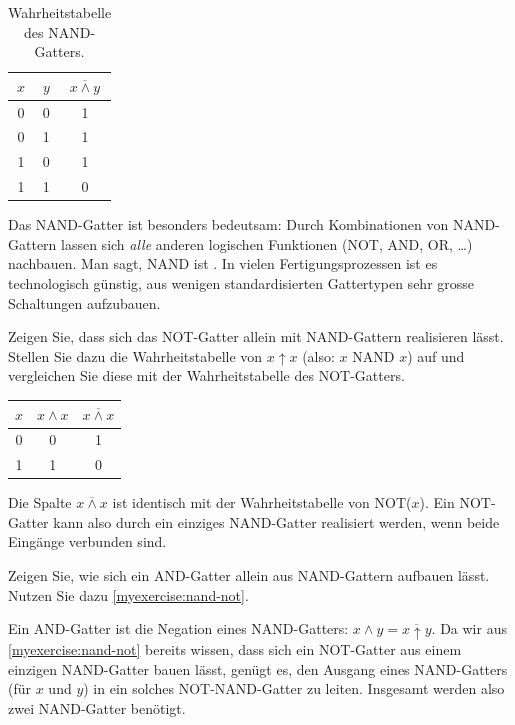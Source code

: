 \begin{table}[H]
    \centering
    \begin{tabular}{c|c||c}
        $x$ & $y$ & $\overline{x \wedge y}$ \\\midrule\midrule
        0 & 0 & 1 \\\midrule
        0 & 1 & 1 \\\midrule
        1 & 0 & 1 \\\midrule
        1 & 1 & 0 \\
    \end{tabular}
    \caption{Wahrheitstabelle des NAND-Gatters.}
    \label{tab:nand}
\end{table}

Das NAND-Gatter ist besonders bedeutsam: Durch Kombinationen von NAND-Gattern lassen sich \emph{alle} anderen logischen Funktionen (NOT, AND, OR, \ldots) nachbauen. Man sagt, NAND ist . In vielen Fertigungsprozessen ist es technologisch günstig, aus wenigen standardisierten Gattertypen sehr grosse Schaltungen aufzubauen.

\begin{myexercise}\label{myexercise:nand-not}
    Zeigen Sie, dass sich das NOT-Gatter allein mit NAND-Gattern realisieren lässt. Stellen Sie dazu die Wahrheitstabelle von $x \uparrow x$ (also: $x$ NAND $x$) auf und vergleichen Sie diese mit der Wahrheitstabelle des NOT-Gatters.
    \begin{myanswer}
        \begin{center}
            \begin{tabular}{c||c|c}
                $x$ & $x \wedge x$ & $\overline{x \wedge x}$ \\\midrule\midrule
                0 & 0 & 1 \\\midrule
                1 & 1 & 0 \\
            \end{tabular}
        \end{center}
        Die Spalte $\overline{x \wedge x}$ ist identisch mit der Wahrheitstabelle von NOT($x$). Ein NOT-Gatter kann also durch ein einziges NAND-Gatter realisiert werden, wenn beide Eingänge verbunden sind.
    \end{myanswer}
\end{myexercise}

\begin{mychallenge}
    Zeigen Sie, wie sich ein AND-Gatter allein aus NAND-Gattern aufbauen lässt. Nutzen Sie dazu \cref{myexercise:nand-not}.
    \begin{myanswer}
        Ein AND-Gatter ist die Negation eines NAND-Gatters: $x \wedge y = \overline{x \uparrow y}$. Da wir aus \cref{myexercise:nand-not} bereits wissen, dass sich ein NOT-Gatter aus einem einzigen NAND-Gatter bauen lässt, genügt es, den Ausgang eines NAND-Gatters (für $x$ und $y$) in ein solches NOT-NAND-Gatter zu leiten. Insgesamt werden also zwei NAND-Gatter benötigt.
    \end{myanswer}
\end{mychallenge}

